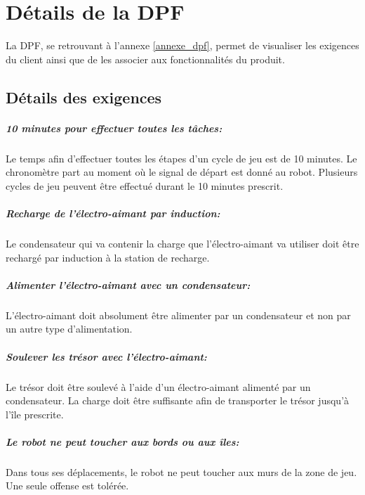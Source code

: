 \chapter{Détails de la DPF}
La DPF, se retrouvant à l'annexe \ref{annexe_dpf}, permet de visualiser les exigences du client ainsi que de les associer aux fonctionnalités du produit.

\section{Détails des exigences}

\paragraph{10 minutes pour effectuer toutes les tâches:}
Le temps afin d'effectuer toutes les étapes d'un cycle de jeu est de 10 minutes. Le chronomètre part au moment où le signal de départ est donné au robot.
Plusieurs cycles de jeu peuvent être effectué durant le 10 minutes prescrit.

\paragraph{Recharge de l'électro-aimant par induction:}
Le condensateur qui va contenir la charge que l'électro-aimant va utiliser doit être rechargé par induction à la station de recharge.

\paragraph{Alimenter l'électro-aimant avec un condensateur:}
L'électro-aimant doit absolument être alimenter par un condensateur et non par un autre type d'alimentation.

\paragraph{Soulever les trésor avec l'électro-aimant:}
Le trésor doit être soulevé à l'aide d'un électro-aimant alimenté par un condensateur. La charge doit être suffisante afin de transporter le trésor jusqu'à l'île prescrite.

\paragraph{Le robot ne peut toucher aux bords ou aux îles:}
Dans tous ses déplacements, le robot ne peut toucher aux murs de la zone de jeu. Une seule offense est tolérée.

